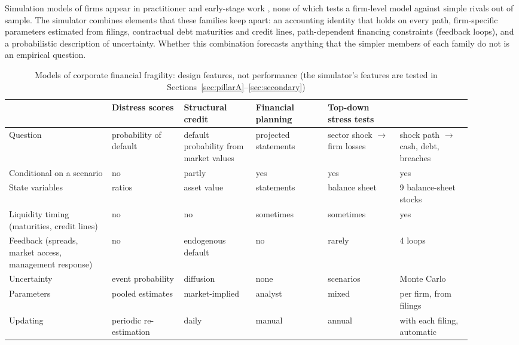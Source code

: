 Simulation models of firms appear in practitioner and early-stage work \citep{westphal2024,anshari2022,bhatia2026,lyytinen2024}, none of which tests a firm-level model against simple rivals out of sample. The simulator combines elements that these families keep apart: an accounting identity that holds on every path, firm-specific parameters estimated from filings, contractual debt maturities and credit lines, path-dependent financing constraints (feedback loops), and a probabilistic description of uncertainty. Whether this combination forecasts anything that the simpler members of each family do not is an empirical question.

\begin{table}[t]
\centering\scriptsize
\setlength{\tabcolsep}{3pt}
\caption{Models of corporate financial fragility: design features, not performance (the simulator's features are tested in Sections~\ref{sec:pillarA}--\ref{sec:secondary})}
\label{tab:framework}
\begin{tabular}{p{0.2\linewidth}p{0.14\linewidth}p{0.14\linewidth}p{0.14\linewidth}p{0.14\linewidth}p{0.14\linewidth}}
\toprule
 & Distress scores & Structural credit & Financial planning & Top-down stress tests & \twin{} \\
\midrule
Question & probability of default & default probability from market values & projected statements & sector shock $\rightarrow$ firm losses & shock path $\rightarrow$ cash, debt, breaches \\
Conditional on a scenario & no & partly & yes & yes & yes \\
State variables & ratios & asset value & statements & balance sheet & 9 balance-sheet stocks \\
Liquidity timing (maturities, credit lines) & no & no & sometimes & sometimes & yes \\
Feedback (spreads, market access, management response) & no & endogenous default & no & rarely & 4 loops \\
Uncertainty & event probability & diffusion & none & scenarios & Monte Carlo \\
Parameters & pooled estimates & market-implied & analyst & mixed & per firm, from filings \\
Updating & periodic re-estimation & daily & manual & annual & with each filing, automatic \\
\bottomrule
\end{tabular}
\end{table}

